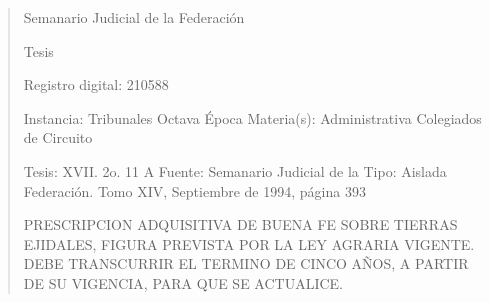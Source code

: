 \documentclass[11pt,a4paper]{article}
\begin{document}
\begin{quote}
                                                   Semanario Judicial de la Federación

                                                  Tesis

 Registro digital: 210588

 Instancia: Tribunales             Octava Época                           Materia(s): Administrativa
 Colegiados de Circuito

 Tesis: XVII. 2o. 11 A             Fuente: Semanario Judicial de la       Tipo: Aislada
                                   Federación.
                                   Tomo XIV, Septiembre de 1994,
                                   página 393


PRESCRIPCION ADQUISITIVA DE BUENA FE SOBRE TIERRAS EJIDALES, FIGURA PREVISTA
POR LA LEY AGRARIA VIGENTE. DEBE TRANSCURRIR EL TERMINO DE CINCO AÑOS, A
PARTIR DE SU VIGENCIA, PARA QUE SE ACTUALICE.



\end{quote}
\end{document}
